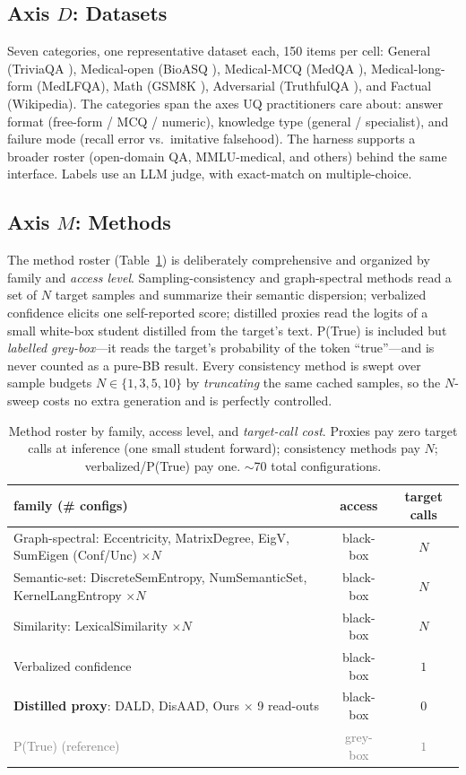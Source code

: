 \documentclass[11pt]{article}
\newcommand{\grey}[1]{\textcolor{gray}{#1}}
\begin{document}
\subsection{Axis $D$: Datasets}
Seven categories, one representative dataset each, 150 items per cell:
General (TriviaQA \citealp{joshi2017triviaqa}), Medical-open (BioASQ
\citealp{tsatsaronis2015bioasq}), Medical-MCQ (MedQA \citealp{jin2021medqa}),
Medical-long-form (MedLFQA), Math (GSM8K \citealp{cobbe2021gsm8k}), Adversarial
(TruthfulQA \citealp{lin2021truthfulqa}), and Factual (Wikipedia). The categories span
the axes UQ practitioners care about: answer format (free-form / MCQ / numeric),
knowledge type (general / specialist), and failure mode (recall error vs.\ imitative
falsehood). The harness supports a broader roster (open-domain QA, MMLU-medical, and
others) behind the same interface. Labels use an LLM judge, with exact-match on
multiple-choice.

\subsection{Axis $M$: Methods}
The method roster (Table~\ref{tab:roster}) is deliberately comprehensive and organized by
family and \emph{access level}. Sampling-consistency and graph-spectral methods read a
set of $N$ target samples and summarize their semantic dispersion; verbalized confidence
elicits one self-reported score; distilled proxies read the logits of a small white-box
student distilled from the target's text. P(True) is included but \emph{labelled
grey-box}---it reads the target's probability of the token ``true''---and is never
counted as a pure-BB result. Every consistency method is swept over sample budgets
$N\in\{1,3,5,10\}$ by \emph{truncating} the same cached samples, so the $N$-sweep costs no
extra generation and is perfectly controlled.

\begin{table}[t]\centering\small
\setlength{\tabcolsep}{3pt}
\begin{tabular}{p{3.5cm} c c}
\toprule
family (\# configs) & access & target calls\\
\midrule
Graph-spectral: Eccentricity, MatrixDegree, EigV, SumEigen (Conf/Unc) $\times N$ & black-box & $N$\\
Semantic-set: DiscreteSemEntropy, NumSemanticSet, KernelLangEntropy $\times N$ & black-box & $N$\\
Similarity: LexicalSimilarity $\times N$ & black-box & $N$\\
Verbalized confidence & black-box & $1$\\
\textbf{Distilled proxy}: DALD, DisAAD, Ours $\times$ 9 read-outs & black-box & $0$\\
\grey{P(True) (reference)} & \grey{grey-box} & \grey{$1$}\\
\bottomrule
\end{tabular}
\caption{Method roster by family, access level, and \emph{target-call cost}. Proxies pay
zero target calls at inference (one small student forward); consistency methods pay $N$;
verbalized/P(True) pay one. $\sim$70 total configurations.}
\label{tab:roster}
\end{table}
\end{document}
